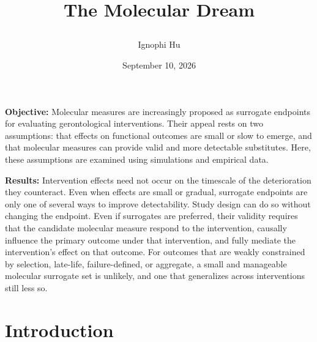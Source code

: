 \documentclass[twocolumn]{article} %
\title{\parbox{\linewidth}{\centering \textbf{The Molecular Dream}}}
\author{Ignophi Hu}
\date{September 10, 2026}
\begin{document}
\maketitle


\begin{tcolorbox}
\textbf{Objective:} Molecular measures are increasingly proposed as surrogate endpoints for evaluating gerontological interventions. Their appeal rests on two assumptions: that effects on functional outcomes are small or slow to emerge, and that molecular measures can provide valid and more detectable substitutes. Here, these assumptions are examined using simulations and empirical data.\newline

\textbf{Results:} Intervention effects need not occur on the timescale of the deterioration they counteract. Even when effects are small or gradual, surrogate endpoints are only one of several ways to improve detectability. Study design can do so without changing the endpoint. Even if surrogates are preferred, their validity requires that the candidate molecular measure respond to the intervention, causally influence the primary outcome under that intervention, and fully mediate the intervention’s effect on that outcome. For outcomes that are weakly constrained by selection, late-life, failure-defined, or aggregate, a small and manageable molecular surrogate set is unlikely, and one that generalizes across interventions still less so.
\end{tcolorbox}

\tableofcontents

\section{Introduction}
\end{document}

